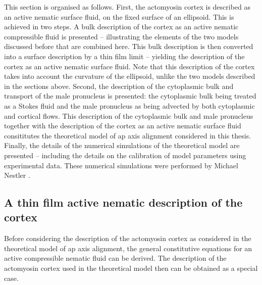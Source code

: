This section is organised as follows. First, the actomyosin cortex is described as an active nematic surface fluid, on the fixed surface of an ellipsoid. This is achieved in two steps. A bulk description of the cortex as an active nematic compressible fluid is presented -- illustrating the elements of the two models discussed before that are combined here. This bulk description is then converted into a surface description by a thin film limit -- yielding the description of the cortex as an active nematic surface fluid. Note that this description of the cortex takes into account the curvature of the ellipsoid, unlike the two models described in the sections above. Second, the description of the cytoplasmic bulk and transport of the male pronucleus is presented: the cytoplasmic bulk being treated as a Stokes fluid \citep{niwayama2011hydrodynamic} and the male pronucleus as being advected by both cytoplasmic and cortical flows. This description of the cytoplasmic bulk and male pronucleus together with the description of the cortex as an active nematic surface fluid consititutes the theoretical model of \ac{ap} axis alignment considered in this thesis. Finally, the details of the numerical simulations of the theoretical model are presented -- including the details on the calibration of model parameters using experimental data. These numerical simulations were performed by Michael Nestler \citep{}.

\subsection{A thin film active nematic description of the cortex}\label{subsec:cortexModelMN}
Before considering the description of the actomyosin cortex as considered in the theoretical model of \ac{ap} axis alignment, the general constitutive equations for an active compressible nematic fluid can be derived. The description of the actomyosin cortex used in the theoretical model then can be obtained as a special case.

